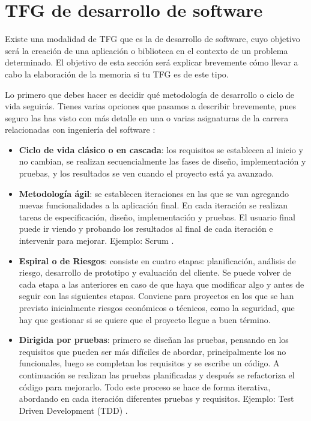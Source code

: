 \section{TFG de desarrollo de software}
\label{apendice:desarrollo}

Existe una modalidad de TFG que es la de desarrollo de software, cuyo objetivo será la creación de una aplicación o biblioteca en el contexto de un problema determinado. El objetivo de esta sección será explicar brevemente cómo llevar a cabo la elaboración de la memoria si tu TFG es de este tipo.

Lo primero que debes hacer es decidir qué metodología de desarrollo o ciclo de vida seguirás. Tienes varias opciones que pasamos a describir brevemente, pues seguro las has visto con más detalle en una o varias asignaturas de la carrera relacionadas con ingeniería del software \cite{sommerville2005ingenieria}: 
\begin{itemize}
    \item \textbf{Ciclo de vida clásico o en cascada}: los requisitos se establecen al inicio y no cambian, se realizan secuencialmente las fases de diseño, implementación y pruebas, y los resultados se ven cuando el proyecto está ya avanzado. 
     \item \textbf{Metodología ágil}: se establecen iteraciones en las que se van agregando nuevas funcionalidades a la aplicación final. En cada iteración se realizan tareas de especificación, diseño, implementación y pruebas. El usuario final puede ir viendo y probando los resultados al final de cada iteración e intervenir para mejorar. Ejemplo: Scrum \cite{larman2004agile}.
     \item \textbf{Espiral o de Riesgos}: consiste en cuatro etapas: planificación, análisis de riesgo, desarrollo de prototipo y evaluación del cliente. Se puede volver de cada etapa a las anteriores en caso de que haya que modificar algo y antes de seguir con las siguientes etapas. Conviene para proyectos en los que se han previsto inicialmente riesgos económicos o técnicos, como la seguridad, que hay que gestionar si se quiere que el proyecto llegue a buen término.
     \item \textbf{Dirigida por pruebas}: primero se diseñan las pruebas, pensando en los requisitos que pueden ser más difíciles de abordar, principalmente los no funcionales, luego se completan los requisitos y se escribe un código. A continuación se realizan las pruebas planificadas y después se refactoriza el código para mejorarlo. Todo este proceso se hace de forma iterativa, abordando en cada iteración diferentes pruebas y requisitos. Ejemplo: Test Driven Development (TDD) \cite{beck2022test}.

\end{itemize}

